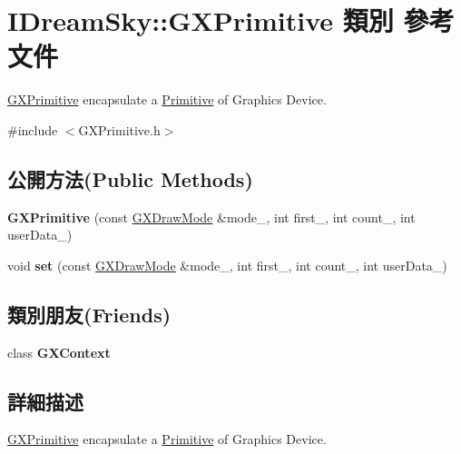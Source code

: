 \hypertarget{class_i_dream_sky_1_1_g_x_primitive}{}\section{I\+Dream\+Sky\+:\+:G\+X\+Primitive 類別 參考文件}
\label{class_i_dream_sky_1_1_g_x_primitive}


\hyperlink{class_i_dream_sky_1_1_g_x_primitive}{G\+X\+Primitive} encapsulate a \hyperlink{class_i_dream_sky_1_1_primitive}{Primitive} of Graphics Device.  




{\ttfamily \#include $<$G\+X\+Primitive.\+h$>$}

\subsection*{公開方法(Public Methods)}
\begin{DoxyCompactItemize}
\item 
{\bfseries G\+X\+Primitive} (const \hyperlink{class_i_dream_sky_1_1_g_x_draw_mode}{G\+X\+Draw\+Mode} \&mode\+\_\+, int first\+\_\+, int count\+\_\+, int user\+Data\+\_\+)\hypertarget{class_i_dream_sky_1_1_g_x_primitive_a5f4ec143be392efa8e3c986bb52f24e1}{}\label{class_i_dream_sky_1_1_g_x_primitive_a5f4ec143be392efa8e3c986bb52f24e1}

\item 
void {\bfseries set} (const \hyperlink{class_i_dream_sky_1_1_g_x_draw_mode}{G\+X\+Draw\+Mode} \&mode\+\_\+, int first\+\_\+, int count\+\_\+, int user\+Data\+\_\+)\hypertarget{class_i_dream_sky_1_1_g_x_primitive_af3e2af13131429340efdbb9e43a537dc}{}\label{class_i_dream_sky_1_1_g_x_primitive_af3e2af13131429340efdbb9e43a537dc}

\end{DoxyCompactItemize}
\subsection*{類別朋友(Friends)}
\begin{DoxyCompactItemize}
\item 
class {\bfseries G\+X\+Context}\hypertarget{class_i_dream_sky_1_1_g_x_primitive_a2c36d7f8865080802bbad88cd73d871c}{}\label{class_i_dream_sky_1_1_g_x_primitive_a2c36d7f8865080802bbad88cd73d871c}

\end{DoxyCompactItemize}


\subsection{詳細描述}
\hyperlink{class_i_dream_sky_1_1_g_x_primitive}{G\+X\+Primitive} encapsulate a \hyperlink{class_i_dream_sky_1_1_primitive}{Primitive} of Graphics Device. 

